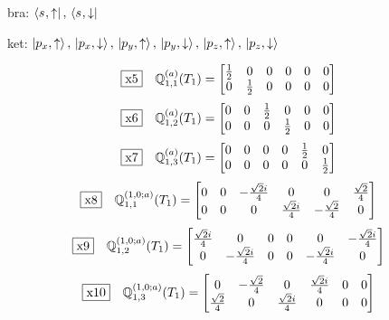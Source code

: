 \documentclass[fleqn,10pt,landscape]{jsarticle}
\begin{document}
\noindent\textbullet\, bra: $\bra{s_{},\uparrow},\, \bra{s_{},\downarrow}$

\noindent\textbullet\, ket: $\ket{p_{x},\uparrow},\, \ket{p_{x},\downarrow},\, \ket{p_{y},\uparrow},\, \ket{p_{y},\downarrow},\, \ket{p_{z},\uparrow},\, \ket{p_{z},\downarrow}$

\begin{dmath*}
\fbox{x5}\quad \mathbb{Q}_{1,1}^{(a)}(T_{1})=\begin{bmatrix} \frac{1}{2} & 0 & 0 & 0 & 0 & 0 \\ 0 & \frac{1}{2} & 0 & 0 & 0 & 0 \end{bmatrix}
\end{dmath*}
\begin{dmath*}
\fbox{x6}\quad \mathbb{Q}_{1,2}^{(a)}(T_{1})=\begin{bmatrix} 0 & 0 & \frac{1}{2} & 0 & 0 & 0 \\ 0 & 0 & 0 & \frac{1}{2} & 0 & 0 \end{bmatrix}
\end{dmath*}
\begin{dmath*}
\fbox{x7}\quad \mathbb{Q}_{1,3}^{(a)}(T_{1})=\begin{bmatrix} 0 & 0 & 0 & 0 & \frac{1}{2} & 0 \\ 0 & 0 & 0 & 0 & 0 & \frac{1}{2} \end{bmatrix}
\end{dmath*}
\begin{dmath*}
\fbox{x8}\quad \mathbb{Q}_{1,1}^{(1,0;a)}(T_{1})=\begin{bmatrix} 0 & 0 & - \frac{\sqrt{2} i}{4} & 0 & 0 & \frac{\sqrt{2}}{4} \\ 0 & 0 & 0 & \frac{\sqrt{2} i}{4} & - \frac{\sqrt{2}}{4} & 0 \end{bmatrix}
\end{dmath*}
\begin{dmath*}
\fbox{x9}\quad \mathbb{Q}_{1,2}^{(1,0;a)}(T_{1})=\begin{bmatrix} \frac{\sqrt{2} i}{4} & 0 & 0 & 0 & 0 & - \frac{\sqrt{2} i}{4} \\ 0 & - \frac{\sqrt{2} i}{4} & 0 & 0 & - \frac{\sqrt{2} i}{4} & 0 \end{bmatrix}
\end{dmath*}
\begin{dmath*}
\fbox{x10}\quad \mathbb{Q}_{1,3}^{(1,0;a)}(T_{1})=\begin{bmatrix} 0 & - \frac{\sqrt{2}}{4} & 0 & \frac{\sqrt{2} i}{4} & 0 & 0 \\ \frac{\sqrt{2}}{4} & 0 & \frac{\sqrt{2} i}{4} & 0 & 0 & 0 \end{bmatrix}
\end{dmath*}
\end{document}
